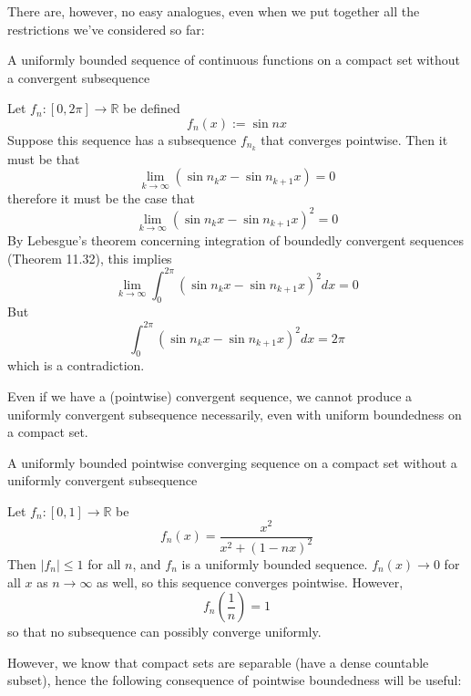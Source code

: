There are, however, no easy analogues, even when we put together all the restrictions we've considered so far:

\begin{example}A uniformly bounded sequence of continuous functions on a compact set without a convergent subsequence

    Let $f_n: [0, 2\pi] \to \mathbb{R}$ be defined 
    \[f_n(x) := \sin nx\]
    Suppose this sequence has a subsequence $f_{n_k}$ that converges pointwise. Then it must be that
    \[\lim_{k \to \infty} (\sin n_k x - \sin n_{k+1}x) = 0\]
    therefore it must be the case that
    \[\lim_{k \to \infty} (\sin n_k x - \sin n_{k+1}x)^2 = 0\]
    By Lebesgue's theorem concerning integration of boundedly convergent sequences (Theorem 11.32), this implies
    \[\lim_{k \to \infty} \int_0^{2\pi} (\sin n_k x - \sin n_{k+1} x)^2 dx = 0\]
    But 
    \[\int_0^{2\pi} (\sin n_k x - \sin n_{k+1} x)^2 dx = 2\pi\]
    which is a contradiction.
\end{example}

Even if we have a (pointwise) convergent sequence, we cannot produce a uniformly convergent subsequence necessarily, even with uniform boundedness on a compact set.

\begin{example}A uniformly bounded pointwise converging sequence on a compact set without a uniformly convergent subsequence

    Let $f_n: [0, 1] \rightarrow \mathbb{R}$ be
    \[f_n(x) = \frac{x^2}{x^2+(1-nx)^2}\]
    Then $|f_n| \leq 1$ for all $n$, and $f_n$ is a uniformly bounded sequence. $f_n(x) \to 0$ for all $x$ as $n \to \infty$ as well, so this sequence converges pointwise.
    However,
    \[f_n\left(\frac{1}{n}\right) = 1\]
    so that no subsequence can possibly converge uniformly.
\end{example}

However, we know that compact sets are separable (have a dense countable subset), hence the following consequence of pointwise boundedness will be useful:

